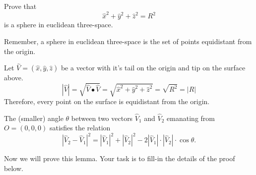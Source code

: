 \documentclass{ximera}
\begin{document}
\begin{problem}
  Prove that
  \[
  \hat{x}^2 + \hat{y}^2 + \hat{z}^2 = R^2
  \]
  is a sphere in euclidean three-space.
  
\begin{hint}
Remember, a sphere in euclidean three-space is the set of points equidistant from the origin.
\end{hint}

\begin{freeResponse}
Let $\hat{V}= \left(\hat{x},\hat{y}, \hat{z}\right)$ be a vector with it's tail on the origin and tip on the surface above.
\[
\left\vert \hat{V}\right\vert = \sqrt{\hat{V}\bullet \hat{V}} = \sqrt{ \hat{x}^2+\hat{y}^2 + \hat{z}^2}= \sqrt{R^2} = \left\vert R \right\vert
\] 
Therefore, every point on the surface is equidistant from the origin.
\end{freeResponse}  
\end{problem}


\begin{lemma}
\label{110} The (smaller) angle $\theta$ between two
vectors $\hat{V}_{1}$ and $\hat{V}_{2}$ emanating from $O=\left(
0,0,0\right)  $ satisfies the relation%
\[
\left\vert \hat{V}_{2}-\hat{V}_{1}\right\vert ^{2}=\left\vert \hat{V}%
_{1}\right\vert ^{2}+\left\vert \hat{V}_{2}\right\vert ^{2}-2\left\vert
\hat{V}_{1}\right\vert \cdot\left\vert \hat{V}_{2}\right\vert \cdot
\cos\theta.
\]
\end{lemma}

Now we will prove this lemma. Your task is to fill-in the details of
the proof below.
\end{document}
